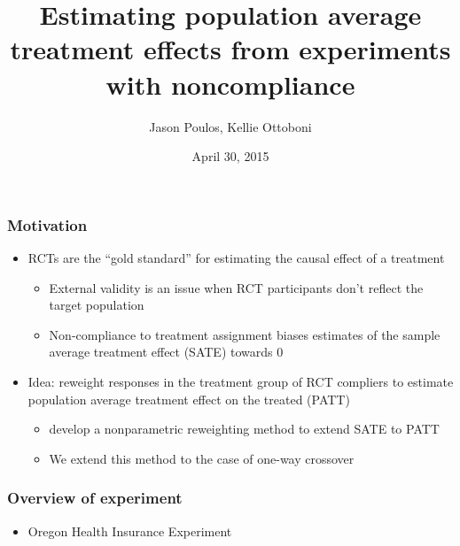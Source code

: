 \documentclass{beamer}
\title[]{Estimating population average treatment effects from experiments with noncompliance}
\author[J. Poulos, K. Ottoboni]{Jason Poulos, Kellie Ottoboni}
\institute[]{Stat 215B}
\date[04/30/15]{April 30, 2015}
\begin{document}
\frame{\titlepage}

\section[Introduction]{}

\begin{frame}
\frametitle{Motivation}
\begin{itemize}
\item RCTs are the ``gold standard'' for estimating the causal effect of a treatment
\begin{itemize}
\item External validity is an issue when RCT participants don't reflect the target population
\item Non-compliance to treatment assignment biases estimates of the sample average treatment effect (SATE) towards $0$
\end{itemize}
\item Idea: reweight responses in the treatment group of RCT compliers to estimate population average treatment effect on the treated (PATT)
\begin{itemize}
\item \cite{Hartman} develop a nonparametric reweighting method to extend SATE to PATT
\item We extend this method to the case of one-way crossover
\end{itemize}
\end{itemize}
\end{frame}



\begin{frame}
\frametitle{Overview of experiment}
\begin{itemize}
\item Oregon Health Insurance Experiment

\end{itemize}
\end{frame}

\section[Estimation]{}
\end{document}

